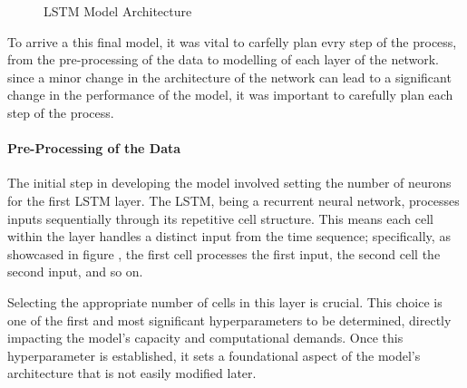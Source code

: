 \begin{figure}[H]
  \caption{LSTM Model Architecture}
  \label{fig:LSTM Model Architecture}
\end{figure}

To arrive a this final model, it was vital to carfelly plan evry step of the process, from the pre-processing of the data to modelling of each layer of the network.\\
since a minor change in the architecture of the network can lead to a significant change in the performance of the model, it was important to carefully plan each step of the process.\\

\paragraph{Pre-Processing of the Data}

The initial step in developing the model involved setting the number of neurons for the first LSTM layer. 
The LSTM, being a recurrent neural network, processes inputs sequentially through its repetitive cell structure. 
This means each cell within the layer handles a distinct input from the time sequence; specifically, as showcased in figure \label{RNN_single_layer}, the first cell processes the first input, the second cell the second input, and so on.

Selecting the appropriate number of cells in this layer is crucial. 
This choice is one of the first and most significant hyperparameters to be determined, directly impacting the model's capacity and computational demands.
Once this hyperparameter is established, it sets a foundational aspect of the model's architecture that is not easily modified later.

